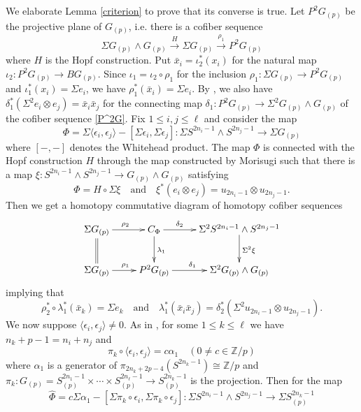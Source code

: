 \documentclass[12pt]{amsart}
\numberwithin{equation}{section}
\theoremstyle{definition}
\theoremstyle{remark}
\begin{document}
We elaborate Lemma \ref{criterion} to prove that its converse is true. Let $P^2G_{(p)}$ be the projective plane of $G_{(p)}$, i.e. there is a cofiber sequence
\begin{equation}
\label{P^2G}
\Sigma G_{(p)}\wedge G_{(p)}\xrightarrow{H}\Sigma G_{(p)}\xrightarrow{\rho_1}P^2G_{(p)}
\end{equation}
where $H$ is the Hopf construction. Put $\bar{x}_i=\iota_2^*(x_i)$ for the natural map $\iota_2:P^2G_{(p)}\to BG_{(p)}$. Since $\iota_1=\iota_2\circ\rho_1$ for the inclusion $\rho_1:\Sigma G_{(p)}\to P^2G_{(p)}$ and $\iota_1^*(x_i)=\Sigma e_i$, we have $\rho_1^*(\bar{x}_i)=\Sigma e_i$. By \cite[Section 3]{L}, we also have $\delta_1^*(\Sigma^2e_i\otimes e_j)=\bar{x}_i\bar{x}_j$ for the connecting map $\delta_1:P^2G_{(p)}\to\Sigma^2G_{(p)}\wedge G_{(p)}$ of the cofiber sequence \eqref{P^2G}. Fix $1\le i,j\le\ell$ and consider the map
$$\Phi=\Sigma\langle\epsilon_i,\epsilon_j\rangle-[\Sigma\epsilon_i,\Sigma\epsilon_j]:\Sigma S^{2n_i-1}\wedge S^{2n_j-1}\to\Sigma G_{(p)}$$
where $[-,-]$ denotes the Whitehead product. The map $\Phi$ is connected with the Hopf construction $H$ through the map constructed by Morisugi \cite[Theorem 5.1]{Mo} such that there is a map $\xi:S^{2n_i-1}\wedge S^{2n_j-1}\to G_{(p)}\wedge G_{(p)}$ satisfying
$$\Phi=H\circ\Sigma\xi\quad\text{and}\quad\xi^*(e_i\otimes e_j)=u_{2n_i-1}\otimes u_{2n_j-1}.$$
Then we get a homotopy commutative diagram of homotopy cofiber sequences
$$\xymatrix{\Sigma G_{(p)}\ar[r]^{\rho_2}\ar@{=}[d]&C_\Phi\ar[r]^(.3){\delta_2}\ar[d]^{\lambda_1}&\Sigma^2 S^{2n_i-1}\wedge S^{2n_j-1}\ar[d]^{\Sigma^2\xi}\\
\Sigma G_{(p)}\ar[r]^{\rho_1}&P^2G_{(p)}\ar[r]^(.45){\delta_1}&\Sigma^2 G_{(p)}\wedge G_{(p)}}$$
implying that
\begin{equation}
\label{lambda1}
\rho_2^*\circ\lambda_1^*(\bar{x}_k)=\Sigma e_k\quad\text{and}\quad\lambda_1^*(\bar{x}_i\bar{x}_j)=\delta_2^*(\Sigma^2u_{2n_i-1}\otimes u_{2n_j-1}).
\end{equation}
We now suppose $\langle\epsilon_i,\epsilon_j\rangle\ne 0$. As in \cite{KK}, for some $1\le k\le\ell$ we have $n_k+p-1=n_i+n_j$ and 
$$\pi_k\circ\langle\epsilon_i,\epsilon_j\rangle=c\alpha_1\quad(0\ne c\in{\mathbb{Z}}/p)$$ 
where $\alpha_1$ is a generator of $\pi_{2n_k+2p-4}(S^{2n_k-1})\cong{\mathbb{Z}}/p$ \cite[Proposition 13.6]{T} and $\pi_k:G_{(p)}=S^{2n_1-1}_{(p)}\times\cdots\times S^{2n_\ell-1}_{(p)}\to S^{2n_k-1}_{(p)}$ is the projection. Then for the map 
$$\widehat{\Phi}=c\Sigma\alpha_1-[\Sigma\pi_k\circ\epsilon_i,\Sigma\pi_k\circ\epsilon_j]:\Sigma S^{2n_i-1}\wedge S^{2n_j-1}\to\Sigma S^{2n_k-1}_{(p)}$$
\end{document}
